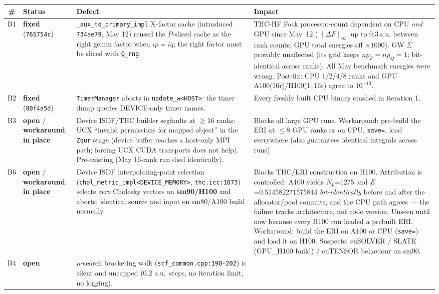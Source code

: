 \documentclass[11pt]{article}
\newcommand{\statusfixed}[1]{\textcolor{good}{\textbf{fixed} (\texttt{#1})}}
\newcommand{\statusopen}{\textcolor{bad}{\textbf{open}}}
\newcommand{\statuswkr}{\textcolor{cpuc}{\textbf{workaround in place}}}
\begin{document}
\begin{table}[H]\small
\begin{tabularx}{\textwidth}{@{}clXX@{}}
\toprule
\# & Status & Defect & Impact \\
\midrule
B1 & \statusfixed{765754c} &
\texttt{\_aux\_to\_primary\_impl} X-factor cache (introduced \texttt{734ae79},
May 12) reused the $P$-sliced cache as the right gemm factor when $ip{=}iq$; the right
factor must be sliced with \texttt{Q\_rng}. &
THC-HF Fock processor-count dependent on CPU \emph{and} GPU since May~12
($\|\Delta F\|_\infty$ up to 0.3\,a.u. between rank counts; GPU total energies off
$\times 1000$). GW $\Sigma$ provably unaffected (its grid keeps $np_P{=}np_Q{=}1$;
bit-identical across ranks). All May benchmark energies were wrong. Post-fix: CPU
1/2/4/8 ranks and GPU A100(16r)/H100(1--16r) agree to $10^{-13}$. \\
B2 & \statusfixed{80f4a5d} &
\texttt{TimerManager} aborts in \texttt{update\_w<HOST>}: the timer dump queries
DEVICE-only timer names. & Every freshly built CPU binary crashed in iteration 1. \\
B3 & \statusopen{} / \statuswkr{} &
Device ISDF/THC builder segfaults at $\geq$16 ranks: UCX ``invalid permissions for
mapped object'' in the \texttt{Zqur} stage (device buffer reaches a host-only MPI path;
forcing UCX CUDA transports does not help). Pre-existing (May 16-rank run died
identically). &
Blocks all large GPU runs. Workaround: pre-build the ERI at $\leq$8 GPU ranks or on CPU,
\texttt{save=}, load everywhere (also guarantees identical integrals across runs). \\
B6 & \statusopen{} / \statuswkr{} &
Device ISDF interpolating-point selection
(\texttt{chol\_metric\_impl<DEVICE\_MEMORY>}, \texttt{thc.icc:1073}) selects \emph{zero}
Cholesky vectors on \textbf{sm90/H100} and aborts; identical source and input on
sm80/A100 build normally. &
Blocks THC/ERI construction on H100. Attribution is controlled: A100 yields $N_p$=1275
and $E$=0.514582271575844 \emph{bit-identically} before and after the allocator/pool
commits, and the CPU path agrees --- the failure tracks architecture, not code version.
Unseen until now because every H100 run loaded a prebuilt ERI. Workaround: build the ERI
on A100 or CPU (\texttt{save=}) and load it on H100. Suspects: cuSOLVER / SLATE
(GPU\_H100 build) / cuTENSOR behaviour on sm90. \\
B4 & \statusopen{} &
$\mu$-search bracketing walk (\texttt{scf\_common.cpp:190-202}) is silent and uncapped
(0.2 a.u.\ steps, no iteration limit, no logging). &

\end{tabularx}
\end{table}
\end{document}
